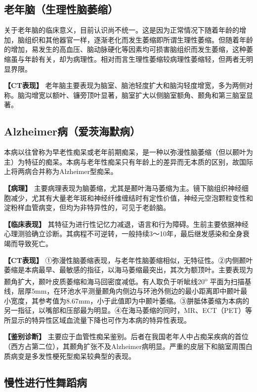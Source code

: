 \subsection{老年脑（生理性脑萎缩）}

关于老年脑的临床意义，目前认识尚不统一。这是因为正常情况下随着年龄的增加，脑组织和其他器官一样，逐渐老化而发生萎缩即所谓生理性萎缩。但随着年龄的增加，易发生的高血压、脑动脉硬化等因素均可损害脑组织而发生萎缩，这种萎缩虽与年龄有关，却为病理性。相对而言生理性萎缩较病理性萎缩轻，但两者无明显界限。

\textbf{【CT表现】}
老年脑主要表现为脑室、脑池轻度扩大和脑沟轻度增宽，多为两侧对称。脑沟增宽以额叶、镰旁顶叶显著，脑室扩大以侧脑室额角、颞角和第三脑室显著。

\subsection{Alzheimer病（爱茨海默病）}

本病以往曾称为早老性痴呆或老年前期痴呆，是一种以弥漫性脑萎缩（但以颞叶为主）为特征的痴呆。本病与老年性痴呆只有年龄上的差异而无本质的区别，故国际上将两病合并称为Alzheimer型痴呆。

\textbf{【病理】}
主要病理表现为脑萎缩，尤其是颞叶海马萎缩为主。镜下脑组织神经细胞减少，尤其有大量老年斑和神经纤维缠结时有定性价值，神经元空泡颗粒变性和淀粉样血管病变，但均为非特异性的，可见于老龄脑。

\textbf{【临床表现】}
其特征为进行性记忆力减退，语言和行为障碍。生前主要依据神经心理测验确立诊断。其病程不可逆转，一般持续3～10年，最后继发感染和全身衰竭而导致死亡。

\textbf{【CT表现】}
①弥漫性脑萎缩表现，与老年性脑萎缩相似，无特征性。②内侧颞叶萎缩是本病最早、最敏感的指征，以海马萎缩最突出，其次为额顶叶。主要表现为颞角扩大，颞叶皮质萎缩和海马回密度减低。有人取负于听眦线20\textsuperscript{o}
平面为扫描基线，层厚5mm，在环池水平测量颞角内侧边与环池外侧边的最小距离即中颞叶最小宽度，其参考值为8.67mm，小于此值即为中颞叶萎缩。③胼胝体萎缩为本病的另一指征，以嘴部和压部最为明显。④在海马萎缩的同时，MR、ECT（PET）等所显示的特异性区域血流量下降也可作为本病的特异性表现。

\textbf{【鉴别诊断】}
主要应于血管性痴呆鉴别。后者在我国老年人中占痴呆疾病的首位（西方占第二位），其颞角扩张不及Alzheimer病明显。严重的皮层下和脑室周围白质病变是多发性梗死型痴呆较典型的表现。

\subsection{慢性进行性舞蹈病}


